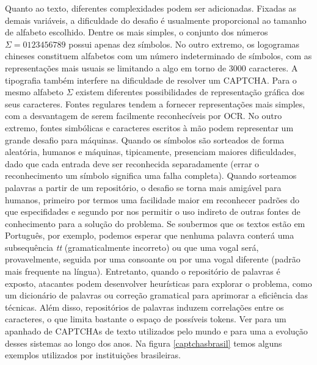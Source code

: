 Quanto ao texto, diferentes complexidades podem ser adicionadas. Fixadas as demais variáveis, a dificuldade do desafio é usualmente proporcional ao tamanho de alfabeto escolhido. Dentre os mais simples, o conjunto dos números $\Sigma = {0123456789}$ possui apenas dez símbolos. No outro extremo, os logogramas chineses constituem alfabetos com um número indeterminado de símbolos, com as representações mais usuais se limitando a algo em torno de $3000$ caracteres. A tipografia também interfere na dificuldade de resolver um CAPTCHA. Para o mesmo alfabeto $\Sigma$ existem diferentes possibilidades de representação gráfica dos seus caracteres. Fontes regulares tendem a fornecer representações mais simples, com a desvantagem de serem facilmente reconhecíveis por OCR. No outro extremo, fontes simbólicas e caracteres escritos à mão podem representar um grande desafio para máquinas. Quando os símbolos são sorteados de forma aleatória, humanos e máquinas, tipicamente, presenciam maiores dificuldades, dado que cada entrada deve ser reconhecida separadamente (errar o reconhecimento um símbolo significa uma falha completa). Quando sorteamos palavras a partir de um repositório, o desafio se torna mais amigável para humanos, primeiro por termos uma facilidade maior em reconhecer padrões do que especifidades e segundo por nos permitir o uso indireto de outras fontes de conhecimento para a solução do problema. Se soubermos que os textos estão em Português, por exemplo, podemos esperar que nenhuma palavra conterá uma subsequência \textit{tt} (gramaticalmente incorreto) ou que uma vogal será, provavelmente, seguida por uma consoante ou por uma vogal diferente (padrão mais frequente na língua). Entretanto, quando o repositório de palavras é exposto, atacantes podem desenvolver heurísticas para explorar o problema, como um dicionário de palavras ou correção gramatical para aprimorar a eficiência das técnicas. Além disso, repositórios de palavras induzem correlações entre os caracteres, o que limita bastante o espaço de possíveis tokens. Ver \cite{bursztein2011text} para um apanhado de CAPTCHAs de texto utilizados pelo mundo e \cite{captcha_review_2017} para uma a evolução desses sistemas ao longo dos anos. Na figura \ref{captchasbrasil} temos alguns exemplos utilizados por instituições brasileiras.

